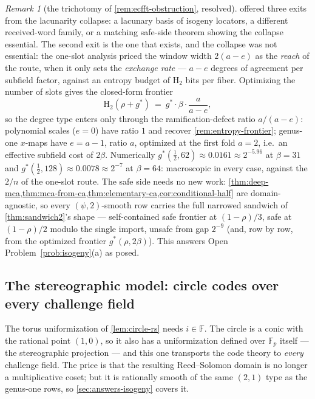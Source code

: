 \documentclass[11pt]{article}
\theoremstyle{definition}
\theoremstyle{remark}
\newtheorem{remark}[theorem]{Remark}
\newcommand{\F}{\mathbb{F}}
\newcommand{\Hb}{\mathrm{H}_2}
\begin{document}
\begin{remark}[the trichotomy of \cref{rem:ecfft-obstruction}, resolved]\label{rem:trichotomy}
 offered three exits from the lacunarity collapse: a lacunary basis of isogeny locators, a different received-word family, or a matching safe-side theorem showing the collapse essential. The second exit is the one that exists, and the collapse was not essential: the one-slot analysis priced the window width $2(a-e)$ as the \emph{reach} of the route, when it only sets the \emph{exchange rate} --- $a-e$ degrees of agreement per subfield factor, against an entropy budget of $\Hb$ bits per fiber. Optimizing the number of slots gives the closed-form frontier
\[
\Hb(\rho+g^*)\ =\ g^*\cdot\beta\cdot\frac a{a-e},
\]
so the degree type enters only through the ramification-defect ratio $a/(a-e)$: polynomial scales ($e=0$) have ratio $1$ and recover \cref{rem:entropy-frontier}; genus-one $x$-maps have $e=a-1$, ratio $a$, optimized at the first fold $a=2$, i.e.\ an effective subfield cost of $2\beta$. Numerically $g^*(\tfrac12,62)\approx0.0161\approx2^{-5.96}$ at $\beta=31$ and $g^*(\tfrac12,128)\approx0.0078\approx2^{-7}$ at $\beta=64$: macroscopic in every case, against the $2/n$ of the one-slot route. The safe side needs no new work: \cref{thm:deep-mca,thm:mca-from-ca,thm:elementary-ca,cor:conditional-half} are domain-agnostic, so every $(\psi,2)$-smooth row carries the full narrowed sandwich of \cref{thm:sandwich2}'s shape --- self-contained safe frontier at $(1-\rho)/3$, safe at $(1-\rho)/2$ modulo the single import, unsafe from gap $2^{-9}$ \textup(and, row by row, from the optimized frontier $g^*(\rho,2\beta)$\textup). This answers Open Problem~\ref{prob:isogeny}\textup{(a)} as posed.
\end{remark}

\subsection{The stereographic model: circle codes over every challenge field}\label{sec:answers-stereo}

The torus uniformization of \cref{lem:circle-rs} needs $i\in\F$. The circle is a conic with the rational point $(1,0)$, so it also has a uniformization defined over $\F_p$ itself --- the stereographic projection --- and this one transports the code theory to \emph{every} challenge field. The price is that the resulting Reed--Solomon domain is no longer a multiplicative coset; but it is rationally smooth of the same $(2,1)$ type as the genus-one rows, so \cref{sec:answers-isogeny} covers it.
\end{document}
